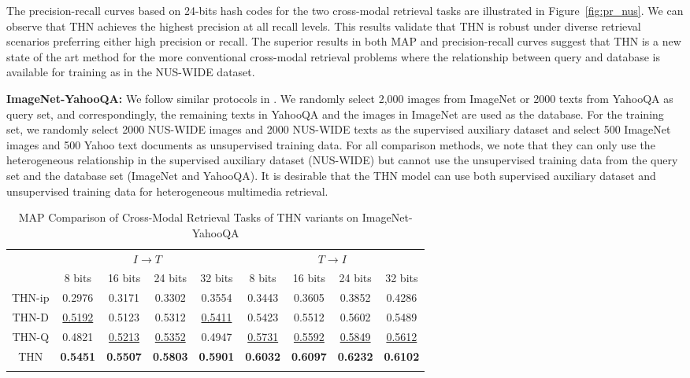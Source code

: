 \documentclass{article}
\begin{document}
The precision-recall curves based on 24-bits hash codes for the two cross-modal retrieval tasks are illustrated in Figure~\ref{fig:pr_nus}. We can observe that THN achieves the highest precision at all recall levels. This results validate that THN is robust under diverse retrieval scenarios preferring either high precision or recall. The superior results in both MAP and precision-recall curves suggest that THN is a new state of the art method for the more conventional cross-modal retrieval problems where the relationship between query and database is available for training as in the NUS-WIDE dataset.

\textbf{ImageNet-YahooQA:} We follow similar protocols in \cite{cite:KDD14HTH}. We randomly select 2,000 images from ImageNet or 2000 texts from YahooQA as query set, and correspondingly, the remaining texts in YahooQA and the images in ImageNet are used as the database. For the training set, we randomly select 2000 NUS-WIDE images and 2000 NUS-WIDE texts as the supervised auxiliary dataset and select 500 ImageNet images and 500 Yahoo text documents as unsupervised training data. For all comparison methods, we note that they can only use the heterogeneous relationship in the supervised auxiliary dataset (NUS-WIDE) but cannot use the unsupervised training data from the query set and the database set (ImageNet and YahooQA). It is desirable that the THN model can use both supervised auxiliary dataset and unsupervised training data for heterogeneous multimedia retrieval.
\begin{table}[tp]
    \addtolength{\tabcolsep}{3.5pt} 
    \centering 
    \caption{MAP Comparison of Cross-Modal Retrieval Tasks of THN variants on ImageNet-YahooQA}
    \label{table:EmpirMAP}
    \small
    \vspace{-5pt}
    \begin{tabular}{c|cccc|cccc}
        \Xhline{1.0pt}
        \multirow{2}{20pt}{\centering Method} & \multicolumn{4}{c|}{\centering $ I \rightarrow T$} &\multicolumn{4}{c}{\centering $ T \rightarrow I$} \\
        \cline{2-9}
        & 8 bits & 16 bits  & 24 bits  & 32 bits & 8 bits & 16 bits  & 24 bits  & 32 bits\\
        \hline
         THN-ip &0.2976  & 0.3171 & 0.3302  & 0.3554 & 0.3443 & 0.3605  & 0.3852  & 0.4286 \\
         THN-D&\underline{0.5192}  & 0.5123 & 0.5312  & \underline{0.5411} & 0.5423 & 0.5512 & 0.5602 & 0.5489\\
         THN-Q & 0.4821& \underline{0.5213}  & \underline{0.5352}  & 0.4947 & \underline{0.5731}  & \underline{0.5592}& \underline{0.5849}  & \underline{0.5612}  \\
         THN & \textbf{0.5451} & \textbf{0.5507}  & \textbf{0.5803} & \textbf{0.5901} &\textbf{0.6032}  & \textbf{0.6097}& \textbf{0.6232} & \textbf{0.6102}  \\
        \Xhline{1.0pt}
    \end{tabular}
    \normalsize
    \vspace{-10pt}
\end{table}
\end{document}
